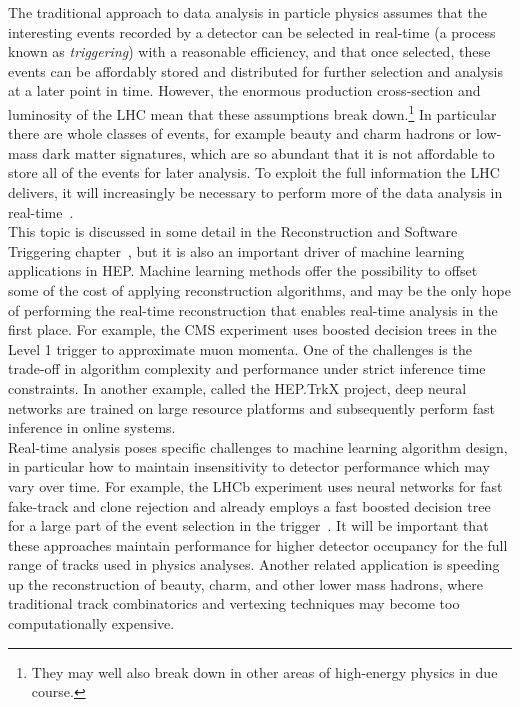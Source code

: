 The traditional approach to data analysis in particle physics assumes that the interesting events recorded by a detector can be selected in real-time (a process known as \emph{triggering}) with a reasonable efficiency, and that once selected, these events can be affordably stored and distributed for further selection and analysis at a later point in time.
However, the enormous production cross-section and luminosity of the LHC mean that these assumptions break down.\footnote{They may well also break down in other areas of high-energy physics in due course.}
In particular there are whole classes of events, for example beauty and charm hadrons or low-mass dark matter signatures, which are so abundant that it is not affordable to store all of the events for later analysis. To exploit the full information the LHC delivers, it will increasingly be necessary to perform more of the data analysis in real-time~\cite{1742-6596-664-8-082004}.\\

This topic is discussed in some detail in the Reconstruction and Software Triggering chapter~\cite{recoCWP}, but it is also an important driver of machine learning applications in HEP. Machine learning methods offer the possibility to offset some of the cost of applying reconstruction algorithms, and may be the only hope of performing the real-time reconstruction that enables real-time analysis in the first place. For example, the CMS experiment uses boosted decision trees in the Level 1 trigger to approximate muon momenta. One of the challenges is the trade-off in algorithm complexity and performance under strict inference time constraints. In another example, called the HEP.TrkX project, deep neural networks are trained on large resource platforms and subsequently perform fast inference in online systems.\\

Real-time analysis poses specific challenges to machine learning algorithm design, in particular how to maintain insensitivity to detector performance which may vary over time. For example, the LHCb experiment uses neural networks for fast fake-track and clone rejection and already employs a fast boosted decision tree for a large part of the event selection in the trigger~\cite{Gligorov:2012qt}. It will be important that these approaches maintain performance for higher detector occupancy for the full range of tracks used in physics analyses. Another related application is speeding up the reconstruction of beauty, charm, and other lower mass hadrons, where traditional track combinatorics and vertexing techniques may become too computationally expensive.\\

